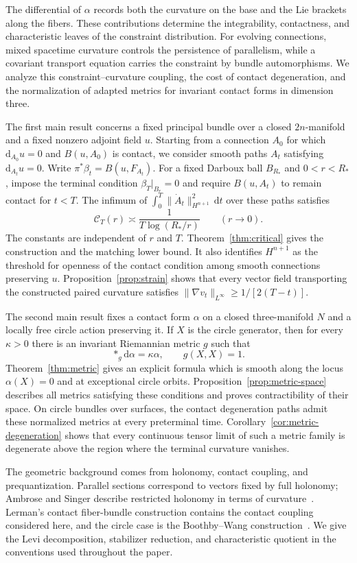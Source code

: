 \documentclass[11pt,a4paper]{article}
\numberwithin{equation}{section}
\theoremstyle{definition}
\theoremstyle{remark}
\newcommand{\dd}{\mathrm d}
\begin{document}
The differential of $\alpha$ records both the curvature on the base and
the Lie brackets along the fibers. These contributions determine the
integrability, contactness, and characteristic leaves of the constraint
distribution. For evolving connections, mixed spacetime curvature controls
the persistence of parallelism, while a covariant transport equation carries
the constraint by bundle automorphisms. We analyze this constraint--curvature
coupling, the cost of contact degeneration, and the normalization of adapted
metrics for invariant contact forms in dimension three.

The first main result concerns a fixed principal bundle over a closed
$2n$-manifold and a fixed nonzero adjoint field $u$. Starting from a
connection $A_0$ for which $\dd_{A_0}u=0$ and $B(u,A_0)$ is contact, we
consider smooth paths $A_t$ satisfying $\dd_{A_t}u=0$. Write
$\pi^*\beta_t=B(u,F_{A_t})$. For a fixed Darboux ball $B_{R_*}$ and
$0<r<R_*$, impose the terminal condition $\beta_T|_{B_r}=0$ and require
$B(u,A_t)$ to remain contact for $t<T$. The infimum of
$\int_0^T\|\dot A_t\|_{H^{n+1}}^2\,\dd t$ over these paths satisfies
\[
 \mathcal C_T(r)\asymp\frac{1}{T\log(R_*/r)}
 \qquad(r\to0).
\]
The constants are independent of $r$ and $T$. Theorem~\ref{thm:critical}
gives the construction and the matching lower bound. It also identifies
$H^{n+1}$ as the threshold for openness of the contact condition among
smooth connections preserving $u$. Proposition~\ref{prop:strain} shows
that every vector field transporting the constructed paired curvature
satisfies $\|\nabla v_t\|_{L^\infty}\geq1/[2(T-t)]$.

The second main result fixes a contact form $\alpha$ on a closed
three-manifold $N$ and a locally free circle action preserving it. If $X$
is the circle generator, then for every $\kappa>0$ there is an invariant
Riemannian metric $g$ such that
\[
 *_g\dd\alpha=\kappa\alpha,\qquad g(X,X)=1.
\]
Theorem~\ref{thm:metric} gives an explicit formula which is smooth along
the locus $\alpha(X)=0$ and at exceptional circle orbits.
Proposition~\ref{prop:metric-space} describes all metrics satisfying these
conditions and proves contractibility of their space. On circle bundles
over surfaces, the contact degeneration paths admit these normalized
metrics at every preterminal time. Corollary~\ref{cor:metric-degeneration}
shows that every continuous tensor limit of such a metric family is
degenerate above the region where the terminal curvature vanishes.

The geometric background comes from holonomy, contact coupling, and
prequantization. Parallel sections correspond to vectors fixed by full
holonomy; Ambrose and Singer describe restricted holonomy in terms of
curvature~\cite{AS}. Lerman's contact fiber-bundle construction
\cite[Proposition 3.1 and Theorem 3.3]{Lerman} contains the contact
coupling considered here, and the circle case is the Boothby--Wang
construction~\cite{BW}. We give the Levi decomposition, stabilizer
reduction, and characteristic quotient in the conventions used throughout
the paper.
\end{document}
